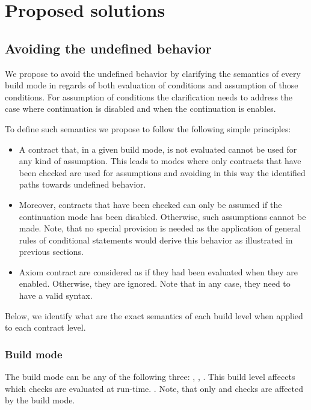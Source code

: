 \section{Proposed solutions}

\subsection{Avoiding the undefined behavior}

We propose to avoid the undefined behavior by clarifying the semantics of every
build mode in regards of both evaluation of conditions and assumption of those
conditions. For assumption of conditions the clarification needs to address the
case where continuation is disabled and when the continuation is enables.

To define such semantics we propose to follow the following simple principles:

\begin{itemize}

\item A contract that, in a given build mode, is not evaluated cannot be used
for any kind of assumption. This leads to modes where only contracts that have
been checked are used for assumptions and avoiding in this way the identified
paths towards undefined behavior.

\item Moreover, contracts that have been checked can only be assumed if the
continuation mode has been disabled. Otherwise, such assumptions cannot be made.
Note, that no special provision is needed as the application of general rules
of conditional statements would derive this behavior as illustrated in previous
sections.

\item Axiom contract are considered as if they had been evaluated 
when they are enabled. Otherwise, they are ignored.
Note that in any case, they need to have a valid syntax.

\end{itemize}

Below, we identify what are the exact semantics of each build level when applied
to each contract level.

\subsubsection{Build mode}

The build mode can be any of the following three: , , 
. This build level affeccts which checks are evaluated at run-time.
\vspace{1em}. Note, that only  and  checks are affected
by the build mode.

